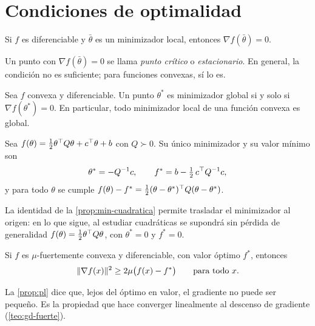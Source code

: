 \addtocounter{definicion}{1}%

\section{Condiciones de optimalidad}

\begin{teorema}\label{teo:fermat}
Si $f$ es diferenciable y $\bar\theta$ es un minimizador local, entonces $\nabla f(\bar\theta)=0$.
\end{teorema}

Un punto con $\nabla f(\bar\theta)=0$ se llama \emph{punto crítico} o \emph{estacionario}. En general, la condición no es suficiente; para funciones convexas, sí lo es.

\begin{teorema}\label{teo:opt-convexa}
Sea $f$ convexa y diferenciable. Un punto $\theta^{\ast}$ es minimizador global si y solo si $\nabla f(\theta^{\ast})=0$. En particular, todo minimizador local de una función convexa es global.
\end{teorema}

\begin{proposicion}\label{prop:min-cuadratica}
Sea $f(\theta)=\tfrac12\theta^{\top} Q\theta+c^{\top}\theta+b$ con $Q\succ 0$. Su único minimizador y su valor mínimo son
\[
\theta^{\ast}=-Q^{-1}c,\qquad f^{\ast}=b-\tfrac12\,c^{\top} Q^{-1}c,
\]
y para todo $\theta$ se cumple $f(\theta)-f^{\ast}=\tfrac12(\theta-\theta^{\ast})^{\top} Q(\theta-\theta^{\ast})$.
\end{proposicion}

La identidad de la \cref{prop:min-cuadratica} permite trasladar el minimizador al origen: en lo que sigue, al estudiar cuadráticas se supondrá sin pérdida de generalidad $f(\theta)=\tfrac12\theta^{\top} Q\theta$, con $\theta^{\ast}=0$ y $f^{\ast}=0$.

\begin{proposicion}\label{prop:pl}
Si $f$ es $\mu$-fuertemente convexa y diferenciable, con valor óptimo $f^{\ast}$, entonces
\[
\lVert\nabla f(x)\rVert^{2}\ge 2\mu\bigl(f(x)-f^{\ast}\bigr)\qquad\text{para todo } x.
\]
\end{proposicion}

La \cref{prop:pl} dice que, lejos del óptimo en valor, el gradiente no puede ser pequeño. Es la propiedad que hace converger linealmente al descenso de gradiente (\cref{teo:gd-fuerte}).

